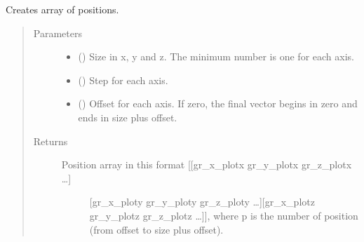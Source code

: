 \documentclass[a4paper,10pt,english]{sphinxmanual}
\begin{document}
\begin{fulllineitems}
\label{\detokenize{autodoc/mrsprint/mrsprint.simulator:mrsprint.simulator.create_positions}}
Creates array of positions.
\begin{quote}\begin{description}
\item[{Parameters}] \leavevmode\begin{itemize}
\item {} 
 (\sphinxstyleliteralemphasis{\sphinxupquote{(}}\sphinxstyleliteralemphasis{\sphinxupquote{)}}) \textendash{} Size in x, y and z. The minimum number is one for each axis.

\item {} 
 (\sphinxstyleliteralemphasis{\sphinxupquote{(}}\sphinxstyleliteralemphasis{\sphinxupquote{)}}) \textendash{} Step for each axis.

\item {} 
 (\sphinxstyleliteralemphasis{\sphinxupquote{(}}\sphinxstyleliteralemphasis{\sphinxupquote{)}}) \textendash{} Offset for each axis. If zero, the final vector begins in
zero and ends in size plus offset.

\end{itemize}

\item[{Returns}] \leavevmode
\begin{description}
\item[{Position array in this format {[}{[}gr\_x\_plotx gr\_y\_plotx gr\_z\_plotx …{]}}] \leavevmode
{[}gr\_x\_ploty gr\_y\_ploty gr\_z\_ploty …{]}{[}gr\_x\_plotz gr\_y\_plotz gr\_z\_plotz …{]}{]},
where p is the number of position (from offset to size plus offset).


\end{description}
\end{description}
\end{quote}
\end{fulllineitems}
\end{document}
